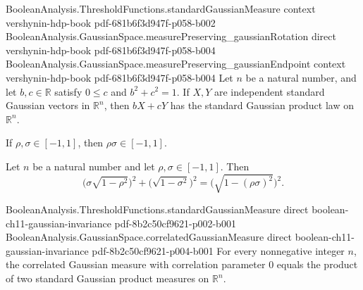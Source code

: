\begin{lemma}
\label{BooleanAnalysis.GaussianSpace.measurePreserving_gaussianCombination}
\leanok
{}
\proofstep
  {BooleanAnalysis.ThresholdFunctions.standardGaussianMeasure}
  {context}
  {vershynin-hdp-book}
  {pdf-681b6f3d947f-p058-b002}
\proofstep
  {BooleanAnalysis.GaussianSpace.measurePreserving_gaussianRotation}
  {direct}
  {vershynin-hdp-book}
  {pdf-681b6f3d947f-p058-b004}
\proofstep
  {BooleanAnalysis.GaussianSpace.measurePreserving_gaussianEndpoint}
  {context}
  {vershynin-hdp-book}
  {pdf-681b6f3d947f-p058-b004}
Let $n$ be a natural number, and let $b,c\in\mathbb R$ satisfy $0\le c$ and $b^2+c^2=1$.
If $X,Y$ are independent standard Gaussian vectors in $\mathbb R^n$, then $bX+cY$ has
the standard Gaussian product law on $\mathbb R^n$.
\end{lemma}

\begin{lemma}
\label{BooleanAnalysis.GaussianSpace.correlation_mul_mem}
\leanok
{}
If $\rho,\sigma\in[-1,1]$, then $\rho\sigma\in[-1,1]$.
\end{lemma}

\begin{lemma}
\label{BooleanAnalysis.GaussianSpace.gaussianNoise_increment_variance}
\leanok
{}
Let $n$ be a natural number and let $\rho,\sigma\in[-1,1]$. Then
\[\bigl(\sigma\sqrt{1-\rho^2}\bigr)^2+\bigl(\sqrt{1-\sigma^2}\bigr)^2=\bigl(\sqrt{1-(\rho\sigma)^2}\bigr)^2.\]
\end{lemma}

\begin{lemma}
\label{BooleanAnalysis.GaussianSpace.correlatedGaussianMeasure_zero}
\leanok
{}
\proofstep
  {BooleanAnalysis.ThresholdFunctions.standardGaussianMeasure}
  {direct}
  {boolean-ch11-gaussian-invariance}
  {pdf-8b2c50cf9621-p002-b001}
\proofstep
  {BooleanAnalysis.GaussianSpace.correlatedGaussianMeasure}
  {direct}
  {boolean-ch11-gaussian-invariance}
  {pdf-8b2c50cf9621-p004-b001}
For every nonnegative integer $n$, the correlated Gaussian measure with correlation
parameter $0$ equals the product of two standard Gaussian product measures on $\mathbb
R^n$.
\end{lemma}

